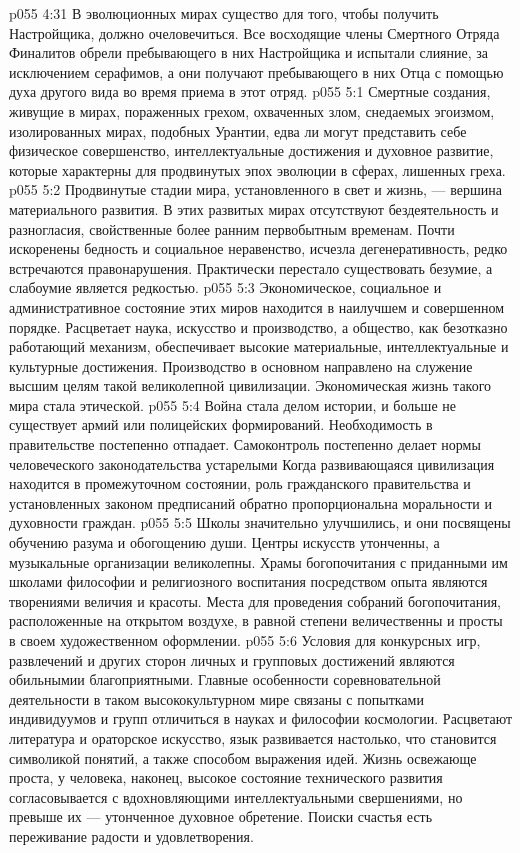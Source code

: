 \vs p055 4:31 В эволюционных мирах существо для того, чтобы получить Настройщика, должно очеловечиться. Все восходящие члены Смертного Отряда Финалитов обрели пребывающего в них Настройщика и испытали слияние, за исключением серафимов, а они получают пребывающего в них Отца с помощью духа другого вида во время приема в этот отряд.
\vs p055 5:1 Смертные создания, живущие в мирах, пораженных грехом, охваченных злом, снедаемых эгоизмом, изолированных мирах, подобных Урантии, едва ли могут представить себе физическое совершенство, интеллектуальные достижения и духовное развитие, которые характерны для продвинутых эпох эволюции в сферах, лишенных греха.
\vs p055 5:2 Продвинутые стадии мира, установленного в свет и жизнь, --- вершина материального развития. В этих развитых мирах отсутствуют бездеятельность и разногласия, свойственные более ранним первобытным временам. Почти искоренены бедность и социальное неравенство, исчезла дегенеративность, редко встречаются правонарушения. Практически перестало существовать безумие, а слабоумие является редкостью.
\vs p055 5:3 Экономическое, социальное и административное состояние этих миров находится в наилучшем и совершенном порядке. Расцветает наука, искусство и производство, а общество, как безотказно работающий механизм, обеспечивает высокие материальные, интеллектуальные и культурные достижения. Производство в основном направлено на служение высшим целям такой великолепной цивилизации. Экономическая жизнь такого мира стала этической.
\vs p055 5:4 Война стала делом истории, и больше не существует армий или полицейских формирований. Необходимость в правительстве постепенно отпадает. Самоконтроль постепенно делает нормы человеческого законодательства устарелыми Когда развивающаяся цивилизация находится в промежуточном состоянии, роль гражданского правительства и установленных законом предписаний обратно пропорциональна моральности и духовности граждан.
\vs p055 5:5 Школы значительно улучшились, и они посвящены обучению разума и обогощению души. Центры искусств утонченны, а музыкальные организации великолепны. Храмы богопочитания с приданными им школами философии и религиозного воспитания посредством опыта являются творениями величия и красоты. Места для проведения собраний богопочитания, расположенные на открытом воздухе, в равной степени величественны и просты в своем художественном оформлении.
\vs p055 5:6 Условия для конкурсных игр, развлечений и других сторон личных и групповых достижений являются обильнымии благоприятными. Главные особенности соревновательной деятельности в таком высококультурном мире связаны с попытками индивидуумов и групп отличиться в науках и философии космологии. Расцветают литература и ораторское искусство, язык развивается настолько, что становится символикой понятий, а также способом выражения идей. Жизнь освежающе проста, у человека, наконец, высокое состояние технического развития согласовывается с вдохновляющими интеллектуальными свершениями, но превыше их --- утонченное духовное обретение. Поиски счастья есть переживание радости и удовлетворения.
